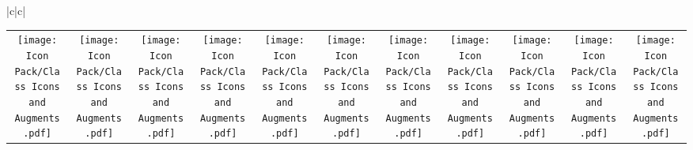 \documentclass[13ex]{article}
\begin{document}
\begin{landscape}
\begin{center}
\begin{tabular}{|c|c|}
\begin{tabular}{c c c c c c c c c c c}
                \rule{0pt}{12pt}\texttt{[image: Icon Pack/Class Icons and Augments.pdf]}\underline{\hspace{1em}}  & \texttt{[image: Icon Pack/Class Icons and Augments.pdf]}\underline{\hspace{1em}}  & \texttt{[image: Icon Pack/Class Icons and Augments.pdf]}\underline{\hspace{1em}}  & \texttt{[image: Icon Pack/Class Icons and Augments.pdf]}\underline{\hspace{1em}}  & \texttt{[image: Icon Pack/Class Icons and Augments.pdf]}\underline{\hspace{1em}}  & \texttt{[image: Icon Pack/Class Icons and Augments.pdf]}\underline{\hspace{1em}}  & \texttt{[image: Icon Pack/Class Icons and Augments.pdf]}\underline{\hspace{1em}} & \texttt{[image: Icon Pack/Class Icons and Augments.pdf]}\underline{\hspace{1em}} & \texttt{[image: Icon Pack/Class Icons and Augments.pdf]}\underline{\hspace{1em}} & \texttt{[image: Icon Pack/Class Icons and Augments.pdf]}\underline{\hspace{1em}} & \texttt{[image: Icon Pack/Class Icons and Augments.pdf]}\underline{\hspace{1em}} \\

\end{tabular}
\end{tabular}
\end{center}
\end{landscape}
\end{document}
